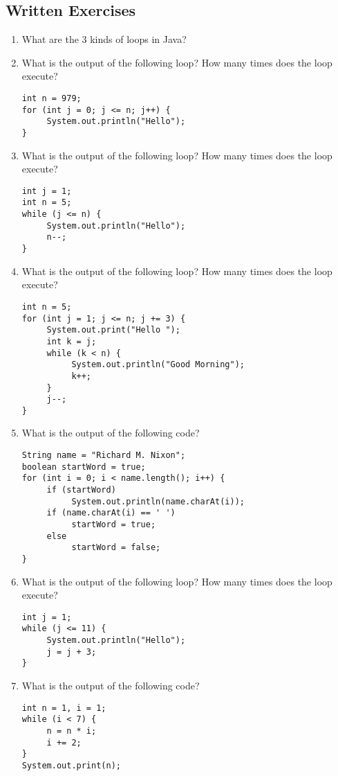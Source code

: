 \subsection{Written Exercises}

\setcounter{counter}{1}
\begin{enumerate}[label={\arabic{counter}\addtocounter{counter}{1}}.]

\item What are the 3 kinds of loops in Java?

\item What is the output of the following loop? How many times does the loop execute?
\begin{lstlisting}
int n = 979;
for (int j = 0; j <= n; j++) {
     System.out.println("Hello");
}
\end{lstlisting}

\item What is the output of the following loop? How many times does the loop execute?
\begin{lstlisting}
int j = 1;
int n = 5;
while (j <= n) {
     System.out.println("Hello");
     n--;
}
\end{lstlisting}

\item What is the output of the following loop? How many times does the loop execute?
\begin{lstlisting}
int n = 5;
for (int j = 1; j <= n; j += 3) {
     System.out.print("Hello ");
     int k = j;
     while (k < n) {
          System.out.println("Good Morning");
          k++;
     }
     j--;
}
\end{lstlisting}

\item What is the output of the following code?
\begin{lstlisting}
String name = "Richard M. Nixon";
boolean startWord = true;
for (int i = 0; i < name.length(); i++) {
     if (startWord)
          System.out.println(name.charAt(i));
     if (name.charAt(i) == ' ')
          startWord = true;
     else
          startWord = false;
}
\end{lstlisting}

\item What is the output of the following loop? How many times does the loop execute?
\begin{lstlisting}
int j = 1;
while (j <= 11) {
     System.out.println("Hello");
     j = j + 3;
}
\end{lstlisting}

\item What is the output of the following code?
\begin{lstlisting}
int n = 1, i = 1;
while (i < 7) {
     n = n * i;
     i += 2;
}
System.out.print(n);
\end{lstlisting}

\end{enumerate}

